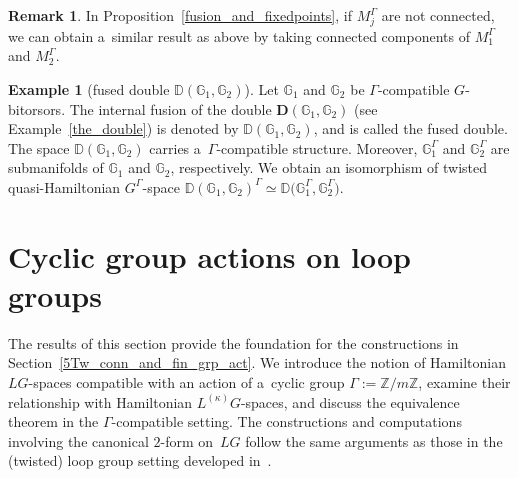 \documentclass[pdftex]{sigma}
\numberwithin{equation}{section}
\theoremstyle{definition}
\newtheorem{Example}[Theorem]{Example}
\newtheorem{Remark}[Theorem]{Remark}
\newcommand{\bG}{\mathbb{G}}
\newcommand{\bD}{\mathbb{D}}
\newcommand{\bZ}{\mathbb{Z}}
\begin{document}
\begin{Remark}
 In Proposition~\ref{fusion_and_fixedpoints}, if $M_j^{\Gamma}$ are not connected, we can obtain a~similar result as above by taking connected components of $M_1^{\Gamma}$ and $M_2^{\Gamma}$.
\end{Remark}

\begin{Example}[fused double $\bD(\bG_1,\bG_2)$]
 Let $\bG_1$ and $\bG_2$ be $\Gamma$-compatible $G$-bitorsors.
 The internal fusion of the double $\textbf{D}(\bG_1,\bG_2)$ (see Example~\ref{the_double}) is denoted by $\bD(\bG_1,\bG_2)$, and is called the fused double.
 The space $\bD(\bG_1,\bG_2)$ carries a~$\Gamma$-compatible structure.
 Moreover, $\bG_1^{\Gamma}$ and $\bG_2^{\Gamma}$ are submanifolds of $\bG_1$ and $\bG_2$, respectively.
 We obtain an isomorphism of twisted quasi-Hamiltonian $G^{\Gamma}$-space
$\bD(\bG_1,\bG_2)^{\Gamma} \simeq \bD\bigl(\bG_1^{\Gamma},\bG_2^{\Gamma}\bigr)$.
\end{Example}

\section{Cyclic group actions on loop groups}\label{4Cyclic_grp_act}

The results of this section provide the foundation for the constructions in Section~\ref{5Tw_conn_and_fin_grp_act}.
We introduce the notion of Hamiltonian $LG$-spaces compatible with an action of a~cyclic group $\Gamma := \bZ/m\bZ$, examine their relationship with Hamiltonian $L^{(\kappa)}G$-spaces, and discuss the equivalence theorem in the $\Gamma$-compatible setting.
The constructions and computations involving the canonical $2$\nobreakdash-form on~$LG$ follow the same arguments as those in the (twisted) loop group setting developed in~\cite{AMM,LYM_twisted_LG}.
\end{document}
